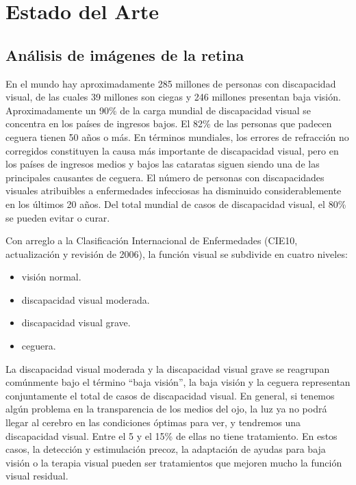 \chapter{Estado del Arte} %

\label{Chapter2} %


\section{An\'alisis de im\'agenes de la retina}

En el mundo hay aproximadamente 285 millones de personas con discapacidad visual, de las cuales 39 millones son ciegas y 246 millones presentan baja visi\'on. Aproximadamente un 90\% de la carga mundial de discapacidad visual se concentra en los pa\'ises de ingresos bajos.
El 82\% de las personas que padecen ceguera tienen 50 años o m\'as. En t\'erminos mundiales, los errores de refracci\'on no corregidos constituyen la causa m\'as importante de discapacidad visual, pero en los pa\'ises de ingresos medios y bajos las cataratas siguen siendo una de las principales causantes de ceguera. El n\'umero de personas con discapacidades visuales atribuibles a enfermedades infecciosas ha disminuido considerablemente en los \'ultimos 20 años. Del total mundial de casos de discapacidad visual, el 80\%  se pueden evitar o curar.

Con arreglo a la Clasificaci\'on Internacional de Enfermedades (CIE10, actualizaci\'on y revisi\'on de 2006), la funci\'on visual se subdivide en cuatro niveles:
\begin{itemize}
\item visi\'on normal.
\item discapacidad visual moderada.
\item discapacidad visual grave.
\item ceguera.
\end{itemize}
La discapacidad visual moderada y la discapacidad visual grave se reagrupan com\'unmente bajo el t\'ermino “baja visi\'on”, la baja visi\'on y la ceguera representan conjuntamente el total de casos de discapacidad visual. En general, si tenemos alg\'un problema en la transparencia de los medios del ojo, la luz ya no podr\'a llegar al cerebro en las condiciones \'optimas para ver, y tendremos una discapacidad visual.
Entre el 5 y el 15\% de ellas no tiene tratamiento. En estos casos, la detecci\'on y estimulaci\'on precoz, la adaptaci\'on de ayudas para baja visi\'on o la terapia visual pueden ser tratamientos que mejoren mucho la funci\'on visual residual.

